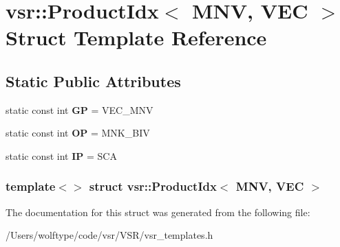 \hypertarget{structvsr_1_1_product_idx_3_01_m_n_v_00_01_v_e_c_01_4}{\section{vsr\-:\-:Product\-Idx$<$ M\-N\-V, V\-E\-C $>$ Struct Template Reference}
\label{structvsr_1_1_product_idx_3_01_m_n_v_00_01_v_e_c_01_4}
}
\subsection*{Static Public Attributes}
\begin{DoxyCompactItemize}
\item 
\hypertarget{structvsr_1_1_product_idx_3_01_m_n_v_00_01_v_e_c_01_4_a08da5edba7e890401715f350d55d8cee}{static const int {\bfseries G\-P} = V\-E\-C\-\_\-\-M\-N\-V}\label{structvsr_1_1_product_idx_3_01_m_n_v_00_01_v_e_c_01_4_a08da5edba7e890401715f350d55d8cee}

\item 
\hypertarget{structvsr_1_1_product_idx_3_01_m_n_v_00_01_v_e_c_01_4_a32b8df7227763eeae013f0aa9cc58e73}{static const int {\bfseries O\-P} = M\-N\-K\-\_\-\-B\-I\-V}\label{structvsr_1_1_product_idx_3_01_m_n_v_00_01_v_e_c_01_4_a32b8df7227763eeae013f0aa9cc58e73}

\item 
\hypertarget{structvsr_1_1_product_idx_3_01_m_n_v_00_01_v_e_c_01_4_a8e99f3f5035a3476358370f1fe01e43b}{static const int {\bfseries I\-P} = S\-C\-A}\label{structvsr_1_1_product_idx_3_01_m_n_v_00_01_v_e_c_01_4_a8e99f3f5035a3476358370f1fe01e43b}

\end{DoxyCompactItemize}
\subsubsection*{template$<$$>$ struct vsr\-::\-Product\-Idx$<$ M\-N\-V, V\-E\-C $>$}



The documentation for this struct was generated from the following file\-:\begin{DoxyCompactItemize}
\item 
/\-Users/wolftype/code/vsr/\-V\-S\-R/vsr\-\_\-templates.\-h\end{DoxyCompactItemize}
